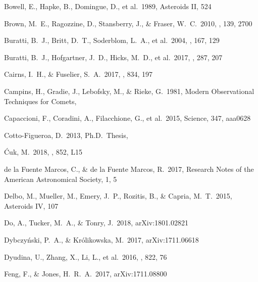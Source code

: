 \documentclass[a4paper,fleqn,usenatbib]{mnras}
\begin{document}
\begin{thebibliography}{99}

 Bowell, E., Hapke, B., Domingue, D., et al.\ 1989, Asteroids II, 524 

 Brown, M.~E., Ragozzine, D., Stansberry, J., \& Fraser, W.~C.\ 2010, \aj, 139, 2700 

 Buratti, B.~J., Britt, D.~T., Soderblom, L.~A., et al.\ 2004, \icarus, 167, 129 

 Buratti, B.~J., Hofgartner, J.~D., Hicks, M.~D., et al.\ 2017, \icarus, 287, 207 

 Cairns, I.~H., \& Fuselier, S.~A.\ 2017, \apj, 834, 197

 Campins, H., Gradie, J., Lebofsky, M., \& Rieke, G.\ 1981, Modern Observational Techniques for Comets,

 Capaccioni, F., Coradini, A., Filacchione, G., et al.\ 2015, Science, 347, aaa0628 

 Cotto-Figueroa, D.\ 2013, Ph.D.~Thesis,  

 {\'C}uk, M.\ 2018, \apjl, 852, L15

 de la Fuente Marcos, C., \& de la Fuente Marcos, R.\ 2017, Research Notes of the American Astronomical Society, 1, 5

 Delbo, M., Mueller, M., Emery, J.~P., Rozitis, B., \& Capria, M.~T.\ 2015, Asteroids IV, 107 

 Do, A., Tucker, M.~A., \& Tonry, J.\ 2018, arXiv:1801.02821

 Dybczy{\'n}ski, P.~A., \& Kr{\'o}likowska, M.\ 2017, arXiv:1711.06618

 Dyudina, U., Zhang, X., Li, L., et al.\ 2016, \apj, 822, 76 

 Feng, F., \& Jones, H.~R.~A.\ 2017, arXiv:1711.08800


\end{thebibliography}
\end{document}
